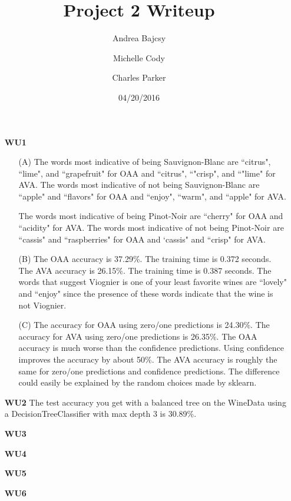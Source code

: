 \documentclass{article}
\title{Project 2 Writeup}
\date{04/20/2016}
\author{Andrea Bajcsy \and Michelle Cody \and Charles Parker }
\begin{document}
	\maketitle
	
	\begin{enumerate}
	
	\item[\textbf{WU1}]
	
	\begin{enumerate}
		\item[(A)] 	 The words most indicative of being Sauvignon-Blanc are ``citrus", ``lime", and ``grapefruit" for OAA and ``citrus", ``"crisp", and ``"lime" for AVA. The words most indicative of not being Sauvignon-Blanc are ``apple" and ``flavors" for OAA and ``enjoy", ``warm", and ``apple" for AVA.
		
		The words most indicative of being Pinot-Noir are ``cherry" for OAA and ``acidity" for AVA. The words most indicative of not being Pinot-Noir are ``cassis" and ``raspberries" for OAA and `cassis" and ``crisp" for AVA.
		
		\item[(B)] The OAA accuracy is 37.29\%. The training time is 0.372 seconds.  The AVA accuracy is 26.15\%.  The training time is 0.387 seconds. The words that suggest Viognier is one of your least favorite wines are ``lovely" and ``enjoy" since the presence of these words indicate that the wine is not Viognier.
		
		\item[(C)] The accuracy for OAA using zero/one predictions is 24.30\%. The accuracy for AVA using zero/one predictions is 26.35\%. The OAA accuracy is much worse than the confidence predictions. Using confidence improves the accuracy by about 50\%. The AVA accuracy is roughly the same for zero/one predictions and confidence predictions. The difference could easily be explained by the random choices made by sklearn.
	\end{enumerate}
	

	\item[\textbf{WU2}] The test accuracy you get with a balanced tree on the WineData using a DecisionTreeClassifier with max depth 3 is 30.89\%.
	
	\item[\textbf{WU3}] 
	
	\item[\textbf{WU4}] 
		
	\item[\textbf{WU5}] 
		
	\item[\textbf{WU6}]
	
	\end{enumerate}
\end{document}
